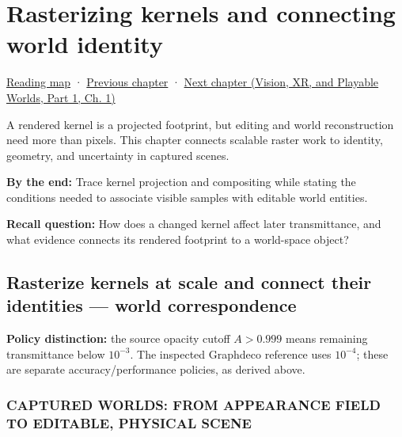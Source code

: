 \chapter{Rasterizing kernels and connecting world identity}\label{06-engine-ii-ch045-rasterizing-kernels-and-connecting-world-identity}\hypertarget{06-engine-ii-ch045}{}\label{stagechapter:06-engine-ii-ch045}

\hypertarget{06-engine-ii-ch045-rasterizing-kernels-and-connecting-world-identity}{}

\hyperref[volume-reading-map]{Reading map} · \hyperref[06-engine-ii-ch044-cross-backend-conversion-and-agreement]{Previous chapter} · \href{../07-Vision-XR-and-Playable-Worlds-P01/main.pdf\#nameddest=02-foundations-ii-ch039}{Next chapter (Vision, XR, and Playable Worlds, Part 1, Ch. 1)}

A rendered kernel is a projected footprint, but editing and world reconstruction need more than pixels. This chapter connects scalable raster work to identity, geometry, and uncertainty in captured scenes.

\textbf{By the end:} Trace kernel projection and compositing while stating the conditions needed to associate visible samples with editable world entities.

\textbf{Recall question:} How does a changed kernel affect later transmittance, and what evidence connects its rendered footprint to a world-space object?

\section{Rasterize kernels at scale and connect their identities --- world correspondence}\label{06-engine-ii-ch045-rasterize-kernels-at-scale-and-connect-their-identities-world-correspondence}

\hypertarget{06-engine-ii-ch045-rasterize-kernels-at-scale-and-connect-their-identities-world-correspondence}{}

\textbf{Policy distinction:} the source opacity cutoff \(A>0.999\) means remaining transmittance below \(10^{-3}\). The inspected Graphdeco reference uses \(10^{-4}\); these are separate accuracy/performance policies, as derived above.

\subsection{CAPTURED WORLDS: FROM APPEARANCE FIELD TO EDITABLE, PHYSICAL SCENE}\label{06-engine-ii-ch045-captured-worlds-from-appearance-field-to-editable-physical-scene}


